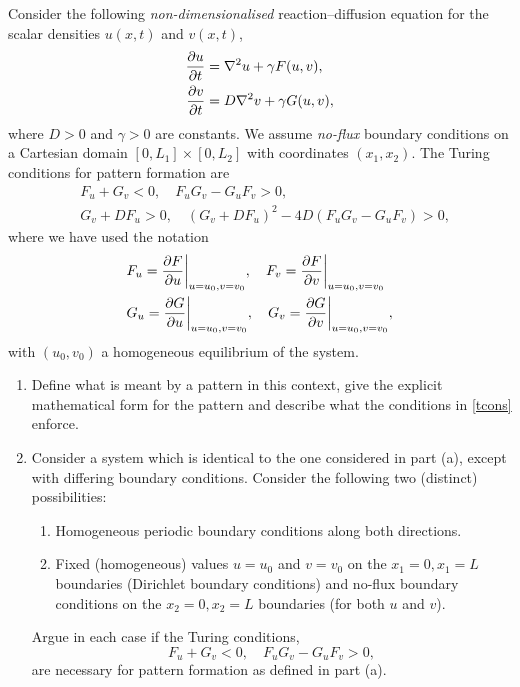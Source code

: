 \documentclass[a4paper, 12pt]{article}
\begin{document}
\begin{enumerate}[label={\bf \arabic{*}.\;}, ref={\arabic{*}},itemsep=3ex, left=0ex]
      {
        Consider the following \emph{non-dimensionalised} reaction--diffusion equation for the scalar densities $u(x,t)$ and $v(x,t)$,
        \begin{align*}
          \pd{u}{t} &= \nabla^2 u + \gamma F(u,v),\\
          \nonumber\pd{v}{t} &= D \nabla^2 v + \gamma G(u,v),
        \end{align*}
        where $D>0$ and $\gamma>0$ are constants. We assume \emph{no-flux} boundary conditions on a Cartesian domain $[0,L_1]\times[0,L_2]$ with coordinates $(x_1,x_2)$. The Turing conditions for pattern formation are
        \begin{align}
          & F_u +G_v <0, \quad F_uG_v  -G_uF_v> 0, \nonumber \\
          & G_v + DF_u>0,\quad (G_v+ D F_u)^2 - 4 D (F_uG_v  -G_uF_v) >0,\label{tcons}
        \end{align}
        where we have used the notation
        \begin{align*}
          &F_{u} = \pd{F}{u}\bigg\vert_{u=u_0,v=v_0},\quad F_{v} = \pd{F}{v}\bigg\vert_{u=u_0,v=v_0}\\
          &G_{u} = \pd{G}{u}\bigg\vert_{u=u_0,v=v_0},\quad G_{v} = \pd{G}{v}\bigg\vert_{u=u_0,v=v_0},
        \end{align*}
        with $(u_0,v_0)$ a homogeneous equilibrium of the system.
        \begin{enumerate}[label=(\alph*)]
          \item
            Define what is meant by a pattern in this context, give the explicit mathematical form for the pattern and describe what the conditions in \cref{tcons} enforce.

          \item Consider a system which is identical to the one considered in part (a), except with differing boundary conditions. Consider the following two (distinct) possibilities:
            \begin{enumerate}[label=(\roman*)]  \label{chemosys}
              \item{Homogeneous periodic boundary conditions along both directions.}
              \item{Fixed (homogeneous) values $u=u_0$ and $v=v_0$ on the $x_1=0,x_1=L$ boundaries (Dirichlet boundary conditions) and no-flux boundary conditions on the $x_2=0,x_2=L$ boundaries  (for both $u$ and $v$).}
            \end{enumerate}
            Argue in each case if the Turing conditions,
            \begin{equation}
              F_u +G_v <0, \quad F_uG_v  -G_uF_v> 0,
            \end{equation}
            are necessary for pattern formation as defined in part (a).


\end{enumerate}}
\end{enumerate}
\end{document}
